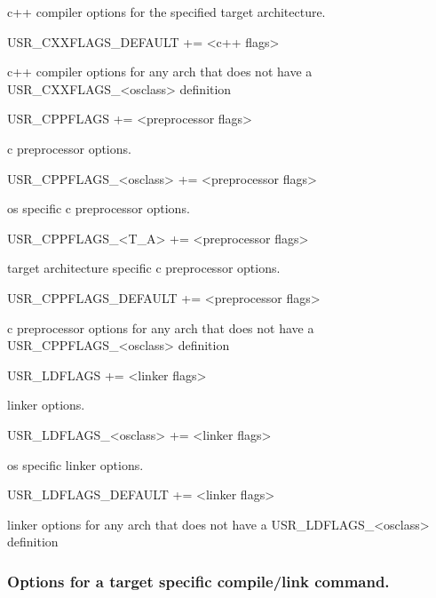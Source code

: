 \begin{description}
c++ compiler options for the specified target architecture.

\item USR\_CXXFLAGS\_DEFAULT += \textless{}c++ flags\textgreater{}

c++ compiler options for any arch that does not have a USR\_CXXFLAGS\_\textless{}osclass\textgreater{} definition

\item {}USR\_CPPFLAGS += \textless{}preprocessor flags\textgreater{}

c preprocessor options.

\item USR\_CPPFLAGS\_\textless{}osclass\textgreater{} += \textless{}preprocessor flags\textgreater{}

os specific c preprocessor options.

\item USR\_CPPFLAGS\_\textless{}T\_A\textgreater{} += \textless{}preprocessor flags\textgreater{}

target architecture specific c preprocessor options.

\item USR\_CPPFLAGS\_DEFAULT += \textless{}preprocessor flags\textgreater{}

c preprocessor options for any arch that does not have a USR\_CPPFLAGS\_\textless{}osclass\textgreater{} definition

\item {}USR\_LDFLAGS += \textless{}linker flags\textgreater{}

linker options.

\item USR\_LDFLAGS\_\textless{}osclass\textgreater{} += \textless{}linker flags\textgreater{}

os specific linker options.

\item USR\_LDFLAGS\_DEFAULT += \textless{}linker flags\textgreater{}

linker options for any arch that does not have a USR\_LDFLAGS\_\textless{}osclass\textgreater{} definition

\end{description} 

\subsubsection{Options for a target specific compile/link command.}

